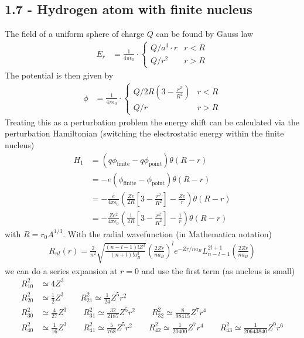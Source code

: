\documentclass[../main.tex]{subfiles}
\begin{document}
\subsection{1.7 - Hydrogen atom with finite nucleus}
The field of a uniform sphere of charge $Q$ can be found by Gauss law
\begin{align}
E_r&=\frac{1}{4\pi\epsilon_0}\cdot\left\{
\begin{array}{ll}
Q/a^3\cdot r & r<R\\
Q/r^2 & r>R
\end{array}
\right.
\end{align}
The potential is then given by
\begin{align}
\phi&=\frac{1}{4\pi\epsilon_0}\cdot\left\{
\begin{array}{ll}
Q/2R\left(3-\frac{r^2}{R^2}\right) & r<R\\
Q/r & r>R
\end{array}
\right.
\end{align}
Treating this as a perturbation problem the energy shift can be calculated via the perturbation Hamiltonian (switching the electrostatic energy within the finite nucleus)
\begin{align}
H_1
&=(q\phi_\text{finite}-q\phi_\text{point})\theta(R-r)\\
&=-e\left(\phi_\text{finite}-\phi_\text{point}\right)\theta(R-r)\\
&=-\frac{e}{4\pi\epsilon_0}\left(\frac{Ze}{2R}
\left[3-\frac{r^2}{R^2}\right]-\frac{Ze}{r}\right)\theta(R-r)\\
&=-\frac{Ze^2}{4\pi\epsilon_0}\left(\frac{1}{2R}
\left[3-\frac{r^2}{R^2}\right]-\frac{1}{r}\right)\theta(R-r)
\end{align}
with $R=r_0A^{1/3}$. With the radial wavefunction (in Mathematica notation)
\begin{align}
R_{nl}(r)=\frac{2}{n^2}\sqrt{\frac{(n-l-1)!Z^3}{(n+l)!a_B^3}}\left(\frac{2Zr}{na_B}\right)^le^{-Zr/na_B}L_{n-l-1}^{2l+1}(\frac{2Zr}{na_B})
\end{align}
we can do a series expansion at $r=0$ and use the first term (as nucleus is small)
\begin{align}
R_{10}^2&\simeq 4Z^3\\
R_{20}^2&\simeq \frac{1}{2}Z^3\qquad R_{21}^2\simeq \frac{1}{24}Z^5r^2\\
R_{30}^2&\simeq \frac{4}{27}Z^3\qquad R_{31}^2\simeq \frac{32}{2187}Z^5r^2\qquad R_{32}^2\simeq \frac{8}{98415}Z^7r^4\\
R_{40}^2&\simeq \frac{1}{16}Z^3\qquad R_{41}^2\simeq \frac{5}{768}Z^5r^2\qquad R_{42}^2\simeq \frac{1}{20400}Z^7r^4\qquad R_{43}^2\simeq \frac{1}{20643840}Z^9r^6
\end{align}
\end{document}
